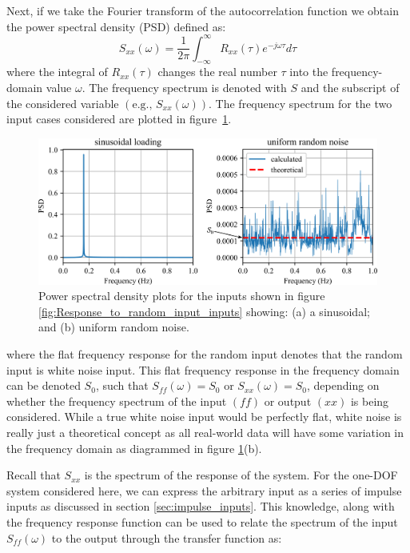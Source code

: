 \documentclass[12pt,letter]{article}
\begin{document}
Next, if we take the Fourier transform of the autocorrelation function we obtain the power spectral density (PSD) defined as:
\begin{equation}
S_{xx}(\omega) =\frac{1}{2 \pi} \int_{-\infty}^{\infty} R_{xx}(\tau) e^{-j \omega \tau}d \tau
\end{equation}
where the integral of $R_{xx}(\tau)$ changes the real number $\tau$ into the frequency-domain value $\omega$. The frequency spectrum is denoted with $S$ and the subscript of the considered variable $(\text{e.g., }S_{xx}(\omega))$.  The frequency spectrum for the two input cases considered are plotted in figure~\ref{fig:Response_to_random_input_PSD}.
\begin{figure}[H]
	\centering
	\includegraphics[width=1\textwidth]{../figures/Response_to_random_input_PSD.png}
	\caption{Power spectral density plots for the inputs shown in figure \ref{fig:Response_to_random_input_inputs} showing: (a) a sinusoidal; and (b) uniform random noise.}
	\label{fig:Response_to_random_input_PSD}
\end{figure}
\noindent where the flat frequency response for the random input denotes that the random input is white noise input.  This flat frequency response in the frequency domain can be denoted $S_0$, such that $S_{ff}(\omega) = S_0$ or $S_{xx}(\omega) = S_0$, depending on whether the frequency spectrum of the input $(ff)$ or output  $(xx)$ is being considered. While a true white noise input would be perfectly flat, white noise is really just a theoretical concept as all real-world data will have some variation in the frequency domain as diagrammed in figure \ref{fig:Response_to_random_input_PSD}(b). 

Recall that $S_{xx}$ is the spectrum of the response of the system. For the one-DOF system considered here, we can express the arbitrary input as a series of impulse inputs as discussed in section \ref{sec:impulse_inputs}. This knowledge, along with the frequency response function can be used to relate the spectrum of the input $S_{ff}(\omega)$ to the output through the transfer function as: 
\end{document}
